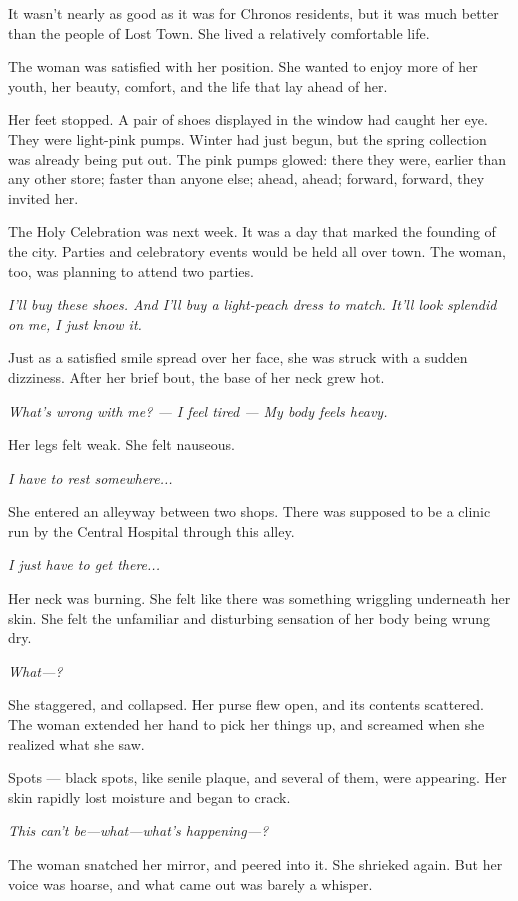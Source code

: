 It wasn't nearly as good as it was for Chronos residents, but it was
much better than the people of Lost Town. She lived a relatively
comfortable life.

The woman was satisfied with her position. She wanted to enjoy more of
her youth, her beauty, comfort, and the life that lay ahead of her.

Her feet stopped. A pair of shoes displayed in the window had caught her
eye. They were light-pink pumps. Winter had just begun, but the spring
collection was already being put out. The pink pumps glowed: there they
were, earlier than any other store; faster than anyone else; ahead,
ahead; forward, forward, they invited her.

The Holy Celebration was next week. It was a day that marked the
founding of the city. Parties and celebratory events would be held all
over town. The woman, too, was planning to attend two parties.

\emph{I'll buy these shoes. And I'll buy a light-peach dress to match. It'll
look splendid on me, I just know it.}

Just as a satisfied smile spread over her face, she was struck with a
sudden dizziness. After her brief bout, the base of her neck grew hot.

\emph{What's wrong with me? --- I feel tired --- My body feels heavy.}

Her legs felt weak. She felt nauseous.

\emph{I have to rest somewhere...}

She entered an alleyway between two shops. There was supposed to be a
clinic run by the Central Hospital through this alley.

\emph{I just have to get there...}

Her neck was burning. She felt like there was something wriggling
underneath her skin. She felt the unfamiliar and disturbing sensation of
her body being wrung dry.

\emph{What---?}

She staggered, and collapsed. Her purse flew open, and its contents
scattered. The woman extended her hand to pick her things up, and
screamed when she realized what she saw.

Spots --- black spots, like senile plaque, and several of them, were
appearing. Her skin rapidly lost moisture and began to crack.

\emph{This can't be---what---what's happening---?}

The woman snatched her mirror, and peered into it. She shrieked again.
But her voice was hoarse, and what came out was barely a whisper.

